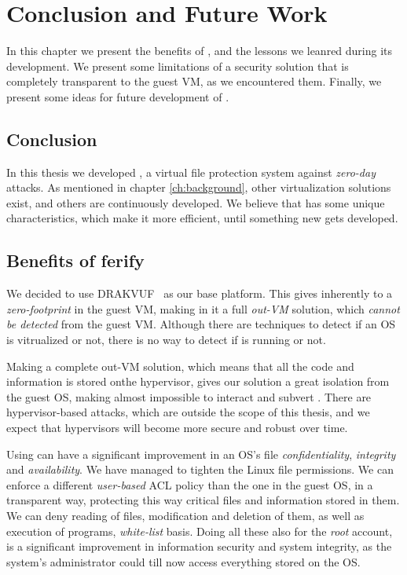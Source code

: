 
\chapter{Conclusion and Future Work}\label{ch:chapter5}

\par In this chapter we present the benefits of , and the lessons we leanred during its development. We present some limitations of a security solution that is completely transparent to the guest \ac{VM}, as we encountered them. Finally, we present some ideas for future development of .

\section{Conclusion}

\par In this thesis we developed , a virtual file protection system against \emph{zero-day} attacks. As mentioned in chapter \ref{ch:background}, other virtualization solutions exist, and others are continuously developed. We believe that  has some unique characteristics, which make it more efficient, until something new gets developed.

\section{Benefits of ferify}

\par We decided to use DRAKVUF~\cite{lengyel2014drakvuf} as our base platform. This gives inherently to  a \emph{zero-footprint} in the guest \ac{VM}, making in it a full \emph{out-\ac{VM}} solution, which \emph{cannot be detected} from the guest \ac{VM}. Although there are techniques to detect if an \ac{OS} is vitrualized or not, there is no way to detect if  is running or not.

\par Making  a complete out-\ac{VM} solution, which means that all the code and information is stored onthe hypervisor, gives our solution a great isolation from the guest \ac{OS}, making almost impossible to interact and subvert . There are hypervisor-based attacks, which are outside the scope of this thesis, and we expect that hypervisors will become more secure and robust over time.

\par Using  can have a significant improvement in an \ac{OS}'s file \emph{confidentiality}, \emph{integrity} and \emph{availability}. We have managed to tighten the Linux file permissions. We can enforce a different \emph{user-based}  \ac{ACL} policy than the one in the guest \ac{OS}, in a transparent way, protecting this way critical files and information stored in them. We can deny reading of files, modification and deletion of them, as well as execution of programs,  \emph{white-list} basis. Doing all these also for the \emph{root} account, is a significant improvement in information security and system integrity, as the system's administrator could till now access everything stored on the \ac{OS}.

